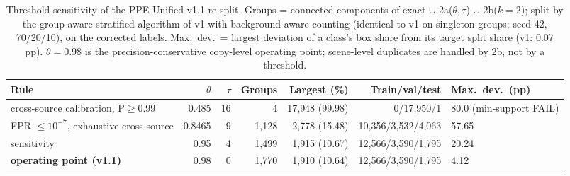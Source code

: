 \begin{table}[t]
\centering\footnotesize
\caption{Threshold sensitivity of the PPE-Unified v1.1 re-split. Groups = connected components of exact $\cup$ 2a($\theta,\tau$) $\cup$ 2b($k=2$); split by the group-aware stratified algorithm of v1 with background-aware counting (identical to v1 on singleton groups; seed 42, 70/20/10), on the corrected labels. Max.\ dev.\ = largest deviation of a class's box share from its target split share (v1: 0.07 pp). $\theta=0.98$ is the precision-conservative copy-level operating point; scene-level duplicates are handled by 2b, not by a threshold.}
\label{tab:threshold_sensitivity}
\begin{tabular}{lrrrrrl}
\toprule
Rule & $\theta$ & $\tau$ & Groups & Largest (\%) & Train/val/test & Max.\ dev.\ (pp) \\
\midrule
cross-source calibration, P$\ge$0.99 & 0.485 & 16 & 4 & 17{,}948 (99.98) & 0/17{,}950/1 & 80.0 (min-support FAIL) \\
FPR $\le 10^{-7}$, exhaustive cross-source & 0.8465 & 9 & 1{,}128 & 2{,}778 (15.48) & 10{,}356/3{,}532/4{,}063 & 57.65 \\
sensitivity & 0.95 & 4 & 1{,}499 & 1{,}915 (10.67) & 12{,}566/3{,}590/1{,}795 & 20.24 \\
\textbf{operating point (v1.1)} & 0.98 & 0 & 1{,}770 & 1{,}910 (10.64) & 12{,}566/3{,}590/1{,}795 & 4.12 \\
\bottomrule
\end{tabular}
\end{table}